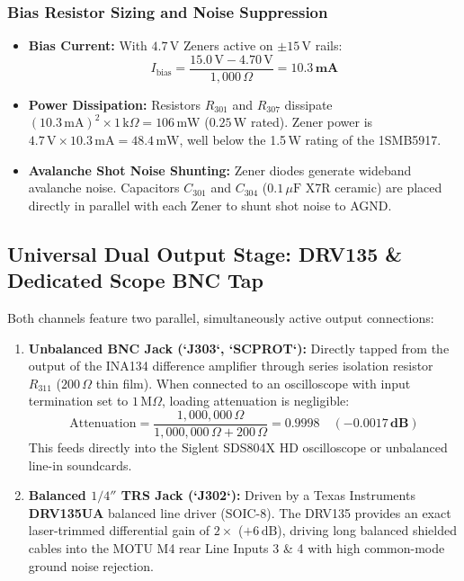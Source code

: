 \documentclass[11pt, letterpaper]{article}
\begin{document}
\subsubsection{Bias Resistor Sizing and Noise Suppression}
\begin{itemize}[leftmargin=1.5em]
    \item \textbf{Bias Current:} With $4.7\,\text{V}$ Zeners active on $\pm 15\,\text{V}$ rails:
    \begin{equation}
        I_{\text{bias}} = \frac{15.0\,\text{V} - 4.70\,\text{V}}{1{,}000\,\Omega} = \mathbf{10.3\,\text{mA}}
    \end{equation}
    \item \textbf{Power Dissipation:} Resistors $R_{301}$ and $R_{307}$ dissipate $(10.3\,\text{mA})^2 \times 1\,\text{k}\Omega = 106\,\text{mW}$ ($0.25\,\text{W}$ rated). Zener power is $4.7\,\text{V} \times 10.3\,\text{mA} = 48.4\,\text{mW}$, well below the 1.5\,W rating of the 1SMB5917.
    \item \textbf{Avalanche Shot Noise Shunting:} Zener diodes generate wideband avalanche noise. Capacitors $C_{301}$ and $C_{304}$ ($0.1\,\mu\text{F}$ X7R ceramic) are placed directly in parallel with each Zener to shunt shot noise to AGND.
\end{itemize}

\subsection{Universal Dual Output Stage: DRV135 \& Dedicated Scope BNC Tap}
Both channels feature two parallel, simultaneously active output connections:
\begin{enumerate}[label=\textbf{\alph*.}]
    \item \textbf{Unbalanced BNC Jack (`J303`, `SCPROT`):} Directly tapped from the output of the INA134 difference amplifier through series isolation resistor $R_{311}$ ($200\,\Omega$ thin film). When connected to an oscilloscope with input termination set to $1\,\text{M}\Omega$, loading attenuation is negligible:
    \begin{equation}
        \text{Attenuation} = \frac{1{,}000{,}000\,\Omega}{1{,}000{,}000\,\Omega + 200\,\Omega} = 0.9998 \quad (-\mathbf{0.0017\,\text{dB}})
    \end{equation}
    This feeds directly into the Siglent SDS804X HD oscilloscope or unbalanced line-in soundcards.
    \item \textbf{Balanced $1/4''$ TRS Jack (`J302`):} Driven by a Texas Instruments \textbf{DRV135UA} balanced line driver (SOIC-8). The DRV135 provides an exact laser-trimmed differential gain of $2\times$ ($+6\,\text{dB}$), driving long balanced shielded cables into the MOTU M4 rear Line Inputs 3 \& 4 with high common-mode ground noise rejection.
\end{enumerate}
\end{document}
